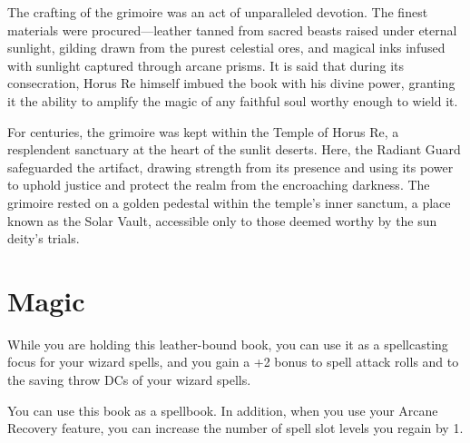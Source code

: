 The crafting of the grimoire was an act of unparalleled devotion. The finest materials were procured—leather tanned from sacred beasts raised under eternal sunlight, gilding drawn from the purest celestial ores, and magical inks infused with sunlight captured through arcane prisms. It is said that during its consecration, Horus Re himself imbued the book with his divine power, granting it the ability to amplify the magic of any faithful soul worthy enough to wield it.

For centuries, the grimoire was kept within the Temple of Horus Re, a resplendent sanctuary at the heart of the sunlit deserts. Here, the Radiant Guard safeguarded the artifact, drawing strength from its presence and using its power to uphold justice and protect the realm from the encroaching darkness. The grimoire rested on a golden pedestal within the temple’s inner sanctum, a place known as the Solar Vault, accessible only to those deemed worthy by the sun deity’s trials.

\section*{Magic}
While you are holding this leather-bound book, you can use it as a spellcasting focus for your wizard spells, and you gain a +2 bonus to spell attack rolls and to the saving throw DCs of your wizard spells.

You can use this book as a spellbook. In addition, when you use your Arcane Recovery feature, you can increase the number of spell slot levels you regain by 1.